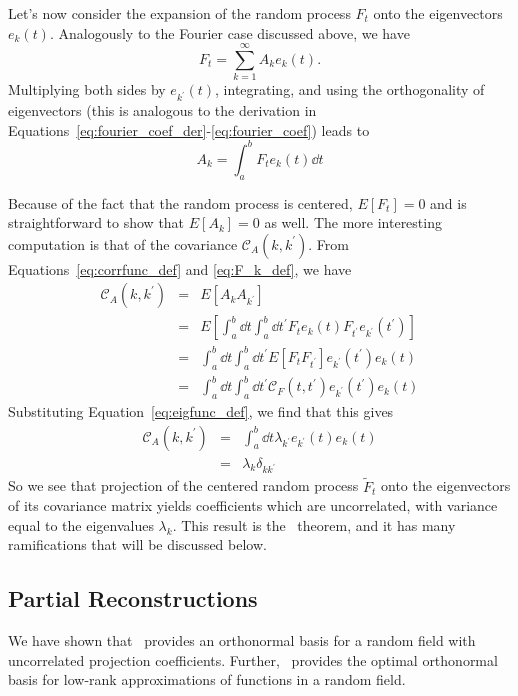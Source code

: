 Let's now consider the expansion of the random process $F_t$ onto the
eigenvectors $e_k(t)$.  Analogously to the Fourier case discussed
above, we have
\begin{equation}
  \label{eq:Ft_decomp}
  F_t = \sum_{k=1}^\infty A_k e_k(t).
\end{equation}
Multiplying both sides by $e_{k^\prime}(t)$, integrating, and using the
orthogonality of eigenvectors (this is analogous to the derivation
in Equations~\ref{eq:fourier_coef_der}-\ref{eq:fourier_coef}) leads to
\begin{equation}
  \label{eq:F_k_def}
  A_k = \int_a^b F_t e_k(t) \dd t
\end{equation}

Because of the fact that the random process is centered,
 $E[F_t] = 0$ and
is straightforward to show that $E[A_k] = 0$ as well.  The more interesting
computation is that of the covariance $\mathcal{C}_A(k, k^\prime)$.
From Equations~\ref{eq:corrfunc_def} and \ref{eq:F_k_def}, we have
\begin{eqnarray}
  \mathcal{C}_A(k, k^\prime)
  &=& E[A_k A_{k^\prime}]\nonumber\\
  &=& E\left[\int_a^b \dd t \int_a^b \dd t^\prime
    {F}_t e_k(t)
    {F}_{t^\prime} e_{k^\prime}(t^\prime)\right] \nonumber\\
  &=& \int_a^b \dd t \int_a^b \dd t^\prime
    E[{F}_t {F}_{t^\prime}]
    e_{k^\prime}(t^\prime) e_k(t) \nonumber\\
  &=& \int_a^b \dd t \int_a^b \dd t^\prime
    \mathcal{C}_F(t, t^\prime)
    e_{k^\prime}(t^\prime) e_k(t) \nonumber
\end{eqnarray}
Substituting Equation~\ref{eq:eigfunc_def}, we find that this gives
\begin{eqnarray}
  \label{eq:cov_A}
  \mathcal{C}_A(k, k^\prime)
  &=& \int_a^b \dd t \lambda_{k^\prime} e_{k^\prime}(t) e_k(t) \nonumber\\
  &=& \lambda_k \delta_{kk^\prime}
\end{eqnarray}
So we see that projection of the centered random process $\tilde{F}_t$ onto
the eigenvectors of its covariance matrix yields coefficients which
are uncorrelated, with variance equal to the eigenvalues $\lambda_k$.
This result is the \KL\ theorem, and it has many ramifications that will
be discussed below.

\subsection{Partial Reconstructions}
We have shown that \KL\ provides an orthonormal basis for a random field
with uncorrelated projection coefficients.  Further, \KL\ provides the
optimal orthonormal basis for low-rank approximations of functions in
a random field.

